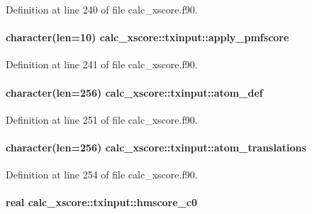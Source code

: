Definition at line 240 of file calc\-\_\-xscore.\-f90.

\hypertarget{structcalc__xscore_1_1txinput_a03d4ee92fb6029b4a7a6f1962d61e398}{
\paragraph[{apply\-\_\-pmfscore}]{\setlength{\rightskip}{0pt plus 5cm}character(len=10) calc\-\_\-xscore\-::txinput\-::apply\-\_\-pmfscore}}\label{structcalc__xscore_1_1txinput_a03d4ee92fb6029b4a7a6f1962d61e398}


Definition at line 241 of file calc\-\_\-xscore.\-f90.

\hypertarget{structcalc__xscore_1_1txinput_a5055a301a66df907e9fced95959f1b02}{
\paragraph[{atom\-\_\-def}]{\setlength{\rightskip}{0pt plus 5cm}character(len=256) calc\-\_\-xscore\-::txinput\-::atom\-\_\-def}}\label{structcalc__xscore_1_1txinput_a5055a301a66df907e9fced95959f1b02}


Definition at line 251 of file calc\-\_\-xscore.\-f90.

\hypertarget{structcalc__xscore_1_1txinput_a19f91015e53fa0c0f03f9dd9274cdd1c}{
\paragraph[{atom\-\_\-translations}]{\setlength{\rightskip}{0pt plus 5cm}character(len=256) calc\-\_\-xscore\-::txinput\-::atom\-\_\-translations}}\label{structcalc__xscore_1_1txinput_a19f91015e53fa0c0f03f9dd9274cdd1c}


Definition at line 254 of file calc\-\_\-xscore.\-f90.

\hypertarget{structcalc__xscore_1_1txinput_a98d87fba290f52c891551d6fbe8b2dbc}{
\paragraph[{hmscore\-\_\-c0}]{\setlength{\rightskip}{0pt plus 5cm}real calc\-\_\-xscore\-::txinput\-::hmscore\-\_\-c0}}\label{structcalc__xscore_1_1txinput_a98d87fba290f52c891551d6fbe8b2dbc}


